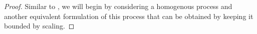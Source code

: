 \documentclass[jair, twoside,11pt,theapa]{article}
\begin{document}
\begin{proof}










Similar to \citet{szepesvari1999unified}, we will begin by considering a homogenous process and another equivalent formulation of this process that can be obtained by keeping it bounded by scaling. 


\end{proof}
\end{document}
